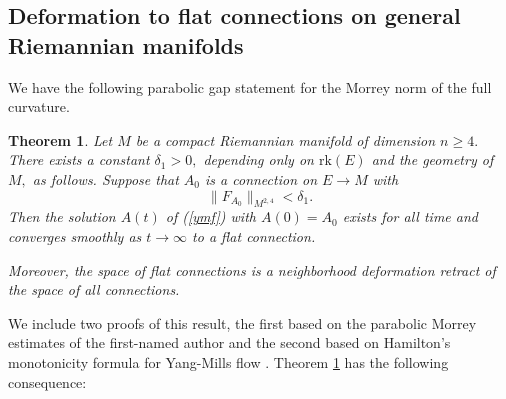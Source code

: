 \documentclass[12pt]{amsart}
\newcommand{\N}{{\mathbb N}}
\renewcommand{\1}{{\mathbf 1}}
\newcommand{\rk}{{\mathrm{rk}}}
\newtheorem{thm}{Theorem}[section]
\theoremstyle{others}
\numberwithin{equation}{section}
\begin{document}
\subsection{Deformation to flat connections on general Riemannian manifolds}
We have the following parabolic gap statement for the Morrey norm of the full curvature. 
\begin{thm}\label{thm:flatgap}
Let %
\(M\) be a compact %
Riemannian manifold of dimension $n \geq 4.$ There exists a constant $\delta_1 > 0,$ depending only on $\rk(E)$ and the geometry of $M,$ as follows. Suppose that \(A_0\) is a connection on \(E \to M\) with
\begin{equation}\label{flatgap:Morreysmall}
\| F_{A_0} \|_{M^{2, 4}} < \delta_1.
\end{equation}
Then the solution $A(t)$ of (\ref{ymf}) with $A(0) = A_0$ exists for all time and converges smoothly as \(t \to \infty\) to a flat connection. 

Moreover, the space of flat connections is a neighborhood deformation retract of the space of all connections.
\end{thm}

We include two proofs of this result, the first based on the parabolic Morrey estimates of the first-named author \cite{estimatespaper} and the second based on Hamilton's monotonicity formula for Yang-Mills flow \cite{hamiltonmonotonicity}. %
Theorem \ref{thm:flatgap} has the following consequence:
\end{document}
